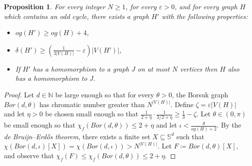 \documentclass[10pt,a4paper]{amsart}
\newtheorem{proposition}[theorem]{Proposition}
\begin{document}
\begin{proposition}\label{prop:construction}
    For every integer $N \geq 1$, for every $\varepsilon > 0$, and for every graph $H$ which contains an odd cycle, there exists a graph $H'$ with the following properties: \begin{itemize}
        \item $og(H') \geq og(H) + 4$,
        \item $\delta(H') \geq \left(\frac{1}{3|V(H)|} - \varepsilon\right)|V(H')|$,
        \item If $H'$ has a homomorphism to a graph $J$ on at most $N$ vertices then $H$ also has a homomorphism to $J$.
    \end{itemize}
\end{proposition}

\begin{proof}
    Let $d \in \mathbb{N}$ be large enough so that for every $\theta > 0$, the Borsuk graph $Bor(d, \theta)$ has chromatic number greater than $N^{|V(H)|}$.
    Define $\zeta = \varepsilon|V(H)|$ and let $\eta>0$ be chosen small enough so that $\frac{1}{2+\eta}\cdot \frac{1}{3/2 + \eta} \geq \frac{1}{3} - \zeta$.
    Let $\theta \in (0, \pi)$ be small enough so that $\chi_f(Bor(d, \theta)) \leq 2 + \eta$ and let $\iota < \frac{\theta}{og(H)+2}$.
    By the \emph{de Bruijn--Erd\H{o}s theorem}, there exists a finite set $X \subseteq \mathbb{S}^d$ such that $\chi(Bor(d, \iota)[X]) = \chi(Bor(d, \iota)) > N^{|V(H)|}$.
    Let $F \coloneqq Bor(d, \theta)[X]$, and observe that $\chi_f(F) \leq \chi_f(Bor(d, \theta)) \leq 2 + \eta$.


\end{proof}
\end{document}
